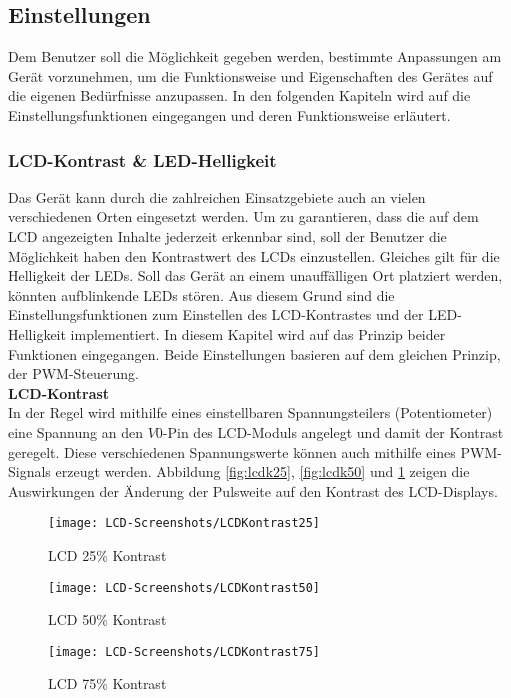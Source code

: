 \subsection{Einstellungen}
Dem Benutzer soll die Möglichkeit gegeben werden, bestimmte Anpassungen am Gerät vorzunehmen, um die Funktionsweise und Eigenschaften des Gerätes auf die eigenen Bedürfnisse anzupassen. In den folgenden Kapiteln wird auf die Einstellungsfunktionen eingegangen und deren Funktionsweise erläutert.
\subsubsection{LCD-Kontrast \& LED-Helligkeit}
Das Gerät kann durch die zahlreichen Einsatzgebiete auch an vielen verschiedenen Orten eingesetzt werden. Um zu garantieren, dass die auf dem LCD angezeigten Inhalte jederzeit erkennbar sind, soll der Benutzer die Möglichkeit haben den Kontrastwert des LCDs einzustellen. Gleiches gilt für die Helligkeit der LEDs. Soll das Gerät an einem unauffälligen Ort platziert werden, könnten aufblinkende LEDs stören. Aus diesem Grund sind die Einstellungsfunktionen zum Einstellen des LCD-Kontrastes und der LED-Helligkeit implementiert. In diesem Kapitel wird auf das Prinzip beider Funktionen eingegangen. Beide Einstellungen basieren auf dem gleichen Prinzip, der PWM-Steuerung. \\
\newline
\textbf{LCD-Kontrast}\\
In der Regel wird mithilfe eines einstellbaren Spannungsteilers (Potentiometer) eine Spannung an den $V0$-Pin des LCD-Moduls angelegt und damit der Kontrast geregelt. Diese verschiedenen Spannungswerte können auch mithilfe eines PWM-Signals erzeugt werden. Abbildung \ref{fig:lcdk25}, \ref{fig:lcdk50} und \ref{fig:lcdk75} zeigen die Auswirkungen der Änderung der Pulsweite auf den Kontrast des LCD-Displays. 
\begin{figure}[h]
	\begin{minipage}{.3\linewidth}
		\centering
		\texttt{[image: LCD-Screenshots/LCDKontrast25]}
		\caption{LCD 25\% Kontrast}
		\label{fig:lcdk25}
	\end{minipage}
	\hfill
	\begin{minipage}{.3\linewidth}
		\centering
		\texttt{[image: LCD-Screenshots/LCDKontrast50]}
		\caption{LCD 50\% Kontrast}
		\label{fig:lcdk50}
	\end{minipage}
	\hfill
	\begin{minipage}{.3\linewidth}
		\centering
		\texttt{[image: LCD-Screenshots/LCDKontrast75]}
		\caption{LCD 75\% Kontrast}
		\label{fig:lcdk75}
	\end{minipage}
	\hfill
\end{figure}
